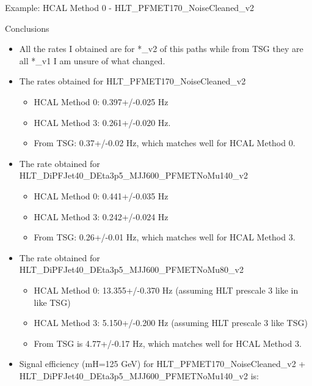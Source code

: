 \documentclass[8pt]{beamer}
\begin{document}
\begin{frame}{Example: HCAL Method 0 - HLT\_PFMET170\_NoiseCleaned\_v2}



\end{frame}

\begin{frame}{Conclusions}
 
\begin{itemize}
  \item All the rates I obtained are for *\_v2 of this paths while from TSG they are all *\_v1 I am unsure of what changed.
  \item The rates obtained for HLT\_PFMET170\_NoiseCleaned\_v2 
  \begin{itemize}
    \item HCAL Method 0: 0.397+/-0.025 Hz 
    \item HCAL Method 3: 0.261+/-0.020 Hz.
    \item From TSG: 0.37+/-0.02 Hz, which matches well for HCAL Method 0.
  \end{itemize}
  \item The rate obtained for HLT\_DiPFJet40\_DEta3p5\_MJJ600\_PFMETNoMu140\_v2
  \begin{itemize}
    \item HCAL Method 0: 0.441+/-0.035 Hz 
    \item HCAL Method 3: 0.242+/-0.024 Hz
    \item From TSG: 0.26+/-0.01 Hz, which matches well for HCAL Method 3.
  \end{itemize}
  \item The rate obtained for HLT\_DiPFJet40\_DEta3p5\_MJJ600\_PFMETNoMu80\_v2
  \begin{itemize}
    \item HCAL Method 0: 13.355+/-0.370 Hz (assuming HLT prescale 3 like in like TSG)
    \item HCAL Method 3: 5.150+/-0.200 Hz (assuming HLT prescale 3 like TSG)
    \item From  TSG is 4.77+/-0.17 Hz, which matches well for HCAL Method 3.
  \end{itemize}
  \item Signal efficiency (mH=125 GeV) for HLT\_PFMET170\_NoiseCleaned\_v2 + HLT\_DiPFJet40\_DEta3p5\_MJJ600\_PFMETNoMu140\_v2 is:
  \begin{itemize}

\end{itemize}
\end{itemize}
\end{frame}
\end{document}
